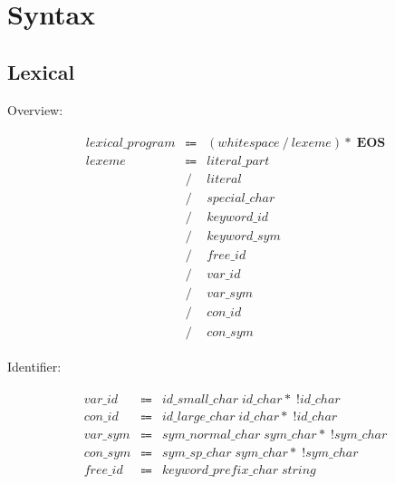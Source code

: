 \chapter{Syntax}

\section{Lexical}

Overview:

\begin{align*}
    \begin{array}{rcll}
        \mathit{lexical\_program}
        &\Coloneq &(\mathit{whitespace} \mathrel{/} \mathit{lexeme}){*}\; \mathbf{EOS} \\
        \mathit{lexeme}
        &\Coloneq &\mathit{literal\_part} \\
        &\mathrel{/} &\mathit{literal} \\
        &\mathrel{/} &\mathit{special\_char} \\
        &\mathrel{/} &\mathit{keyword\_id} \\
        &\mathrel{/} &\mathit{keyword\_sym} \\
        &\mathrel{/} &\mathit{free\_id} \\
        &\mathrel{/} &\mathit{var\_id} \\
        &\mathrel{/} &\mathit{var\_sym} \\
        &\mathrel{/} &\mathit{con\_id} \\
        &\mathrel{/} &\mathit{con\_sym}
    \end{array}
\end{align*}

Identifier:

\begin{align*}
    \begin{array}{rcll}
        \mathit{var\_id}
        &\Coloneq &\mathit{id\_small\_char}\; \mathit{id\_char}{*}\; \mathop{!} \mathit{id\_char} \\
        \mathit{con\_id}
        &\Coloneq &\mathit{id\_large\_char}\; \mathit{id\_char}{*}\; \mathop{!} \mathit{id\_char} \\
        \mathit{var\_sym}
        &\Coloneq &\mathit{sym\_normal\_char}\; \mathit{sym\_char}{*}\; \mathop{!} \mathit{sym\_char} \\
        \mathit{con\_sym}
        &\Coloneq &\mathit{sym\_sp\_char}\; \mathit{sym\_char}{*}\; \mathop{!} \mathit{sym\_char} \\
        \mathit{free\_id}
        &\Coloneq &\mathit{keyword\_prefix\_char}\; \mathit{string}
    \end{array}
\end{align*}

